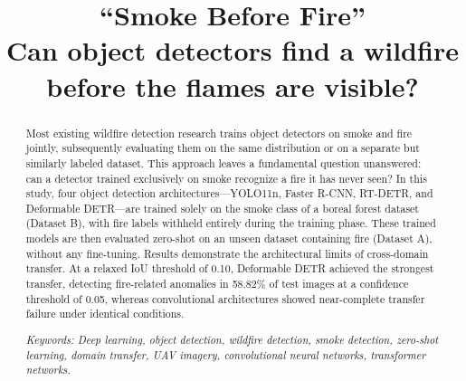 \documentclass[conference]{IEEEtran}
\begin{document}
\title{``Smoke Before Fire'' \\
Can object detectors find a wildfire before the flames are visible?}

\author{
}

\maketitle

\begin{abstract}
Most existing wildfire detection research trains object detectors on smoke and fire jointly, subsequently evaluating them on the same distribution or on a separate but similarly labeled dataset. This approach leaves a fundamental question unanswered: can a detector trained exclusively on smoke recognize a fire it has never seen? In this study, four object detection architectures---YOLO11n, Faster R-CNN, RT-DETR, and Deformable DETR---are trained solely on the smoke class of a boreal forest dataset (Dataset B), with fire labels withheld entirely during the training phase. These trained models are then evaluated zero-shot on an unseen dataset containing fire (Dataset A), without any fine-tuning. Results demonstrate the architectural limits of cross-domain transfer. At a relaxed IoU threshold of 0.10, Deformable DETR achieved the strongest transfer, detecting fire-related anomalies in 58.82\% of test images at a confidence threshold of 0.05, whereas convolutional architectures showed near-complete transfer failure under identical conditions.

\textit{Keywords: Deep learning, object detection, wildfire detection, smoke detection, zero-shot learning, domain transfer, UAV imagery, convolutional neural networks, transformer networks.}
\end{abstract}
\end{document}
